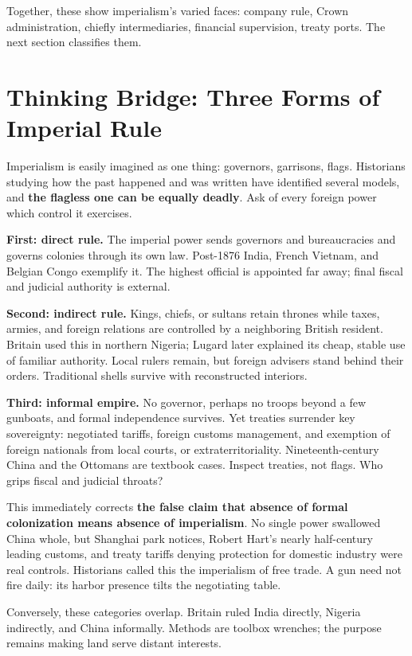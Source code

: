 Together, these show imperialism's varied faces: company rule, Crown administration, chiefly intermediaries, financial supervision, treaty ports. The next section classifies them.

\section{Thinking Bridge: Three Forms of Imperial Rule}
Imperialism is easily imagined as one thing: governors, garrisons, flags. Historians studying how the past happened and was written have identified several models, and \textbf{the flagless one can be equally deadly}. Ask of every foreign power which control it exercises.

\textbf{First: direct rule.} The imperial power sends governors and bureaucracies and governs colonies through its own law. Post-1876 India, French Vietnam, and Belgian Congo exemplify it. The highest official is appointed far away; final fiscal and judicial authority is external.

\textbf{Second: indirect rule.} Kings, chiefs, or sultans retain thrones while taxes, armies, and foreign relations are controlled by a neighboring British resident. Britain used this in northern Nigeria; Lugard later explained its cheap, stable use of familiar authority. Local rulers remain, but foreign advisers stand behind their orders. Traditional shells survive with reconstructed interiors.

\textbf{Third: informal empire.} No governor, perhaps no troops beyond a few gunboats, and formal independence survives. Yet treaties surrender key sovereignty: negotiated tariffs, foreign customs management, and exemption of foreign nationals from local courts, or extraterritoriality. Nineteenth-century China and the Ottomans are textbook cases. Inspect treaties, not flags. Who grips fiscal and judicial throats?

This immediately corrects \textbf{the false claim that absence of formal colonization means absence of imperialism}. No single power swallowed China whole, but Shanghai park notices, Robert Hart's nearly half-century leading customs, and treaty tariffs denying protection for domestic industry were real controls. Historians called this the imperialism of free trade. A gun need not fire daily: its harbor presence tilts the negotiating table.

Conversely, these categories overlap. Britain ruled India directly, Nigeria indirectly, and China informally. Methods are toolbox wrenches; the purpose remains making land serve distant interests.

